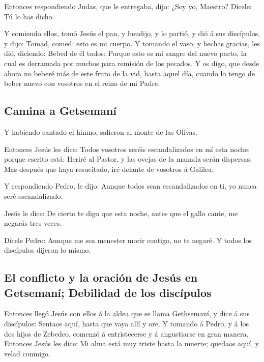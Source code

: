  Entonces respondiendo Judas, que le entregaba, dijo:
¿Soy yo, Maestro? Dícele: Tú lo has dicho.

 Y comiendo ellos, tomó Jesús el pan, y bendijo, y lo
partió, y dió á sus discípulos, y dijo: Tomad, comed: esto es mi cuerpo.
 Y tomando el vaso, y hechas gracias, les dió, diciendo:
Bebed de él todos;  Porque esto es mi sangre del nuevo
pacto, la cual es derramada por muchos para remisión de los pecados.
 Y os digo, que desde ahora no beberé más de este fruto
de la vid, hasta aquel día, cuando lo tengo de beber nuevo con vosotros
en el reino de mi Padre.

\hypertarget{camina-a-getsemanuxed}{%
\subsection{Camina a Getsemaní}\label{camina-a-getsemanuxed}}

 Y habiendo cantado el himno, salieron al monte de las
Olivas.

 Entonces Jesús les dice: Todos vosotros seréis
escandalizados en mí esta noche; porque escrito está: Heriré al Pastor,
y las ovejas de la manada serán dispersas.  Mas después
que haya resucitado, iré delante de vosotros á Galilea.

 Y respondiendo Pedro, le dijo: Aunque todos sean
escandalizados en ti, yo nunca seré escandalizado.

 Jesús le dice: De cierto te digo que esta noche, antes
que el gallo cante, me negarás tres veces.

 Dícele Pedro: Aunque me sea menester morir contigo, no
te negaré. Y todos los discípulos dijeron lo mismo.

\hypertarget{el-conflicto-y-la-oraciuxf3n-de-jesuxfas-en-getsemanuxed-debilidad-de-los-discuxedpulos}{%
\subsection{El conflicto y la oración de Jesús en Getsemaní; Debilidad
de los
discípulos}\label{el-conflicto-y-la-oraciuxf3n-de-jesuxfas-en-getsemanuxed-debilidad-de-los-discuxedpulos}}

 Entonces llegó Jesús con ellos á la aldea que se llama
Gethsemaní, y dice á sus discípulos: Sentaos aquí, hasta que vaya allí y
ore.  Y tomando á Pedro, y á los dos hijos de Zebedeo,
comenzó á entristecerse y á angustiarse en gran manera. 
Entonces Jesús les dice: Mi alma está muy triste hasta la muerte;
quedaos aquí, y velad conmigo.

